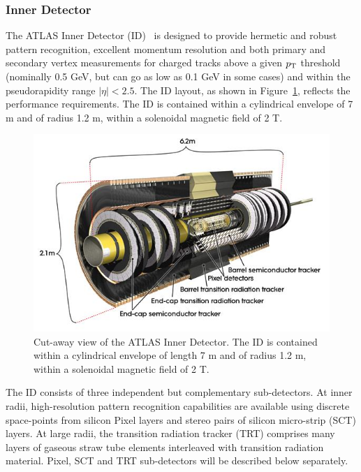 \subsubsection{Inner Detector}

The ATLAS Inner Detector (ID)~\cite{Aad:2008zzm} is designed to provide hermetic and robust pattern recognition, excellent momentum resolution and both primary and secondary vertex measurements for charged tracks above a given $p_\text{T}$ threshold (nominally 0.5 GeV, but can go as low as 0.1 GeV in some cases) and within the pseudorapidity range $|\eta|<2.5$. The ID layout, as shown in Figure~\ref{fig:detector_ATLAS_ID}, reflects the performance requirements. The ID is contained within a cylindrical envelope of 7 m and of radius 1.2 m, within a solenoidal magnetic field of 2 T.

\begin{figure}[H]
\centering
\includegraphics[width=.95\linewidth]{figs/chapter_detector/ATLAS_ID.jpg}
\caption{Cut-away view of the ATLAS Inner Detector. The ID is contained within a cylindrical envelope of length 7 m and of radius 1.2 m, within a solenoidal magnetic field of 2 T.}
\label{fig:detector_ATLAS_ID}
\end{figure}

The ID consists of three independent but complementary sub-detectors. At inner radii, high-resolution pattern recognition capabilities are available using discrete space-points from silicon Pixel layers and stereo pairs of silicon micro-strip (SCT) layers. At large radii, the transition radiation tracker (TRT) comprises many layers of gaseous straw tube elements interleaved with transition radiation material. Pixel, SCT and TRT sub-detectors will be described below separately.




